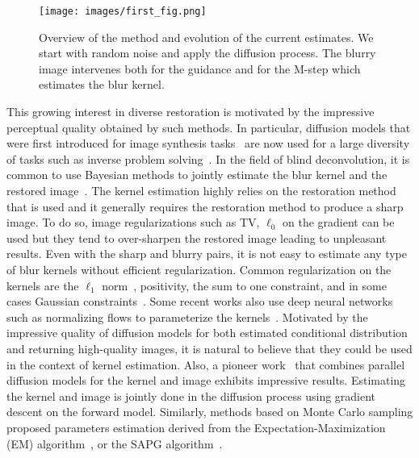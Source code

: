 \documentclass[10pt,twocolumn,letterpaper]{article}
\newcommand{\andres}[1]{{\color{red}\textbf{AA:} #1}}
\begin{document}
%
\begin{figure*}[t]
    \centering
    \texttt{[image: images/first\_fig.png]}
    \caption{Overview of the method and evolution of the current estimates. We start with random noise and apply the diffusion process. The blurry image intervenes both for the guidance and for the M-step which estimates the blur kernel.}
    \vspace{-5pt}
\end{figure*}
%
This growing interest in diverse restoration is motivated by the impressive perceptual quality obtained by such methods. In particular, diffusion models that were first introduced for image synthesis tasks~\cite{ho_denoising_2020, song_denoising_2021, ho_classifier-free_2022} are now used for a large diversity of tasks such as inverse problem solving~\cite{kawar_denoising_2022, chung_diffusion_2023, song_pseudoinverse-guided_2023}.  
%
In the field of blind deconvolution, it is common to use Bayesian methods to jointly estimate the blur kernel and the restored image~\cite{perrone_total_2014, anger_blind_2019, luo_deep_2022, ren_neural_2020}. The kernel estimation highly relies on the restoration method that is used and it generally requires the restoration method to produce a sharp image. To do so, image regularizations such as TV, $\ell_0$ on the gradient can be used but they tend to over-sharpen the restored image leading to unpleasant results.  %
Even with the sharp and blurry pairs, it is not easy to estimate any type of blur kernels without efficient regularization. Common regularization on the kernels are the $\ell_1$ norm~\cite{chung_parallel_2023}, positivity, the sum to one constraint, and in some cases Gaussian constraints~\cite{bell-kligler_blind_2019}. Some recent works also use deep neural networks such as normalizing flows to parameterize the kernels~\cite{liang21fkp}.
%
Motivated by the impressive quality of diffusion models for both estimated conditional distribution and returning high-quality images, it is natural to believe that they could be used in the context of kernel estimation. Also, a pioneer work~\cite{chung_parallel_2023} that combines parallel diffusion models for the kernel and image exhibits impressive results. Estimating the kernel and image is jointly done in the diffusion process using gradient descent on the forward model. 
%
%
Similarly, methods based on Monte Carlo sampling proposed parameters estimation derived from the Expectation-Maximization (EM) algorithm~\cite{guo_agem_2019, gao_deepgem_2021}, or the SAPG algorithm~\cite{Vidal2020, Fort2019}.
\end{document}
